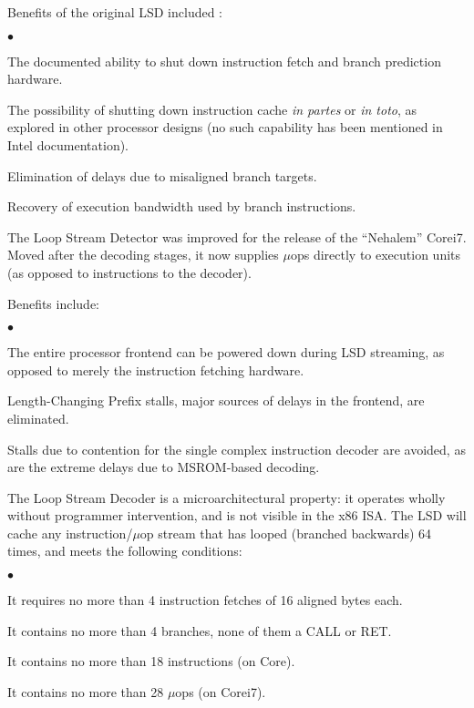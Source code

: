 \documentclass[]{sigplanconf}
\newcommand{\squishlist}{\begin{list}{$\bullet$}
  {\setlength{\itemsep}{0pt}
    \setlength{\parsep}{3pt}
    \setlength{\topsep}{3pt}
    \setlength{\partopsep}{0pt}
    \setlength{\leftmargin}{1.5em}
    \setlength{\labelwidth}{1em}
    \setlength{\labelsep}{0.5em}}}
\newcommand{\squishend}{\end{list}}
\begin{document}

Benefits of the original LSD included \cite{inteloptimize}:
\squishlist
\item The documented ability to shut down instruction fetch and branch prediction hardware.
\item The possibility of shutting down instruction cache \textit{in partes} or
\textit{in toto}, as explored in other processor designs \cite{badulescu} (no
such capability has been mentioned in Intel documentation).
\item Elimination of delays due to misaligned branch targets.
\item Recovery of execution bandwidth used by branch instructions.
\squishend

The Loop Stream Detector was improved for the release of the ``Nehalem''
Core\texttrademark i7. Moved after the decoding stages, it now supplies $\mu$ops directly
to execution units (as opposed to instructions to the decoder).


Benefits include:
\squishlist
\item The entire processor frontend can be powered down during LSD streaming,
as opposed to merely the instruction fetching hardware.
\item Length-Changing Prefix stalls, major sources of delays in the frontend,
are eliminated.
\item Stalls due to contention for the single complex instruction decoder are
avoided, as are the extreme delays due to MSROM-based decoding.
\squishend

The Loop Stream Decoder is a microarchitectural property: it operates wholly
without programmer intervention, and is not visible in the x86 ISA. The LSD
will cache any instruction/$\mu$op stream that has looped (branched backwards)
64 times, and meets the following conditions:
\squishlist
\item It requires no more than 4 instruction fetches of 16 aligned
bytes each.
\item It contains no more than 4 branches, none of them a CALL or RET.
\item It contains no more than 18 instructions (on Core).
\item It contains no more than 28 $\mu$ops (on Core\texttrademark i7).
\squishend
\end{document}

